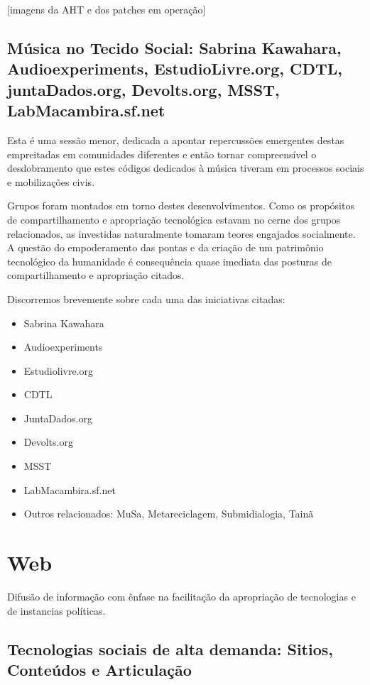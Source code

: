 [imagens da AHT e dos patches em operação]

   \subsection{Música no Tecido Social: Sabrina Kawahara, Audioexperiments, EstudioLivre.org, CDTL, juntaDados.org, Devolts.org, MSST, LabMacambira.sf.net}

Esta é uma sessão menor, dedicada a apontar repercussões emergentes destas empreitadas em comunidades diferentes
e então tornar compreensível o desdobramento que estes códigos dedicados à música tiveram em processos sociais
e mobilizações civis.

Grupos foram montados em torno destes desenvolvimentos. Como os propósitos de compartilhamento
e apropriação tecnológica estavam no cerne dos grupos relacionados, as investidas
naturalmente tomaram teores engajados socialmente. A questão do empoderamento das pontas
e da criação de um patrimônio tecnológico da humanidade é consequência quase imediata
das posturas de compartilhamento e apropriação citados.

Discorremos brevemente sobre cada uma das iniciativas citadas:

\begin{itemize}
    \item Sabrina Kawahara
    \item Audioexperiments
    \item Estudiolivre.org
    \item CDTL
    \item JuntaDados.org
    \item Devolts.org
    \item MSST
    \item LabMacambira.sf.net
    \item Outros relacionados: MuSa, Metareciclagem, Submidialogia, Tainã
\end{itemize}


\section{Web}

  Difusão de informação com ênfase na facilitação
  da apropriação de tecnologias e de instancias políticas.

   \subsection{Tecnologias sociais de alta demanda: Sitios, Conteúdos e Articulação}

